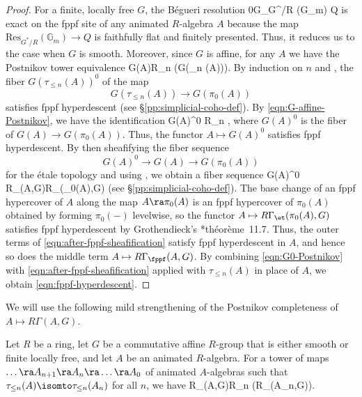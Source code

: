 \begin{proof}
For a finite, locally free $G$, the B\'{e}gueri resolution
\be \label{Begueri}
0\to G\to {}_{G^\ast/R} (\mathbb G_m) \to Q
\ee
is exact on the fppf site of any animated $R$-algebra $A$ because the map $\mathrm{Res}_{G^\ast/R} (\mathbb G_m) \to Q$ is faithfully flat and finitely presented. Thus, it reduces us to the case when $G$ is smooth. Moreover, since $G$ is affine, for any $A$ we have the Postnikov tower equivalence
\be \label{eqn:G-affine-Postnikov}
\tst G(A)\isomto R\lim_n (G(\tau_{\leq n} (A))).
\ee
By induction on $n$ and , the fiber $G(\tau_{\leq n}(A))^0$ of the map
\[
G(\tau_{\leq n}(A))\to G(\pi_0(A))
\]
satisfies fppf hyperdescent (see \S\ref{pp:simplicial-coho-def}). %
 By \eqref{eqn:G-affine-Postnikov}, we have the identification
\be \label{eqn:G0-Postnikov}
\tst G(A)^0 \cong R\lim_n ,
\ee
where $G(A)^0$ is the fiber of $G(A)\to G(\pi_0(A))$. Thus, the functor $A \mapsto G(A)^0$ satisfies fppf hyperdescent. By then sheafifying the fiber sequence
\[
G(A)^0 \to G(A)\to G(\pi_0(A))
\]
for the \'etale topology and using , we obtain a fiber sequence
\be \label{eqn:after-fppf-sheafification}
G(A)^0 \to R\Gamma_\et(A,G)\to R\Gamma_\et(\pi_0(A),G)
\ee
(see \S\ref{pp:simplicial-coho-def}). The base change of an fppf hypercover of $A$ along the map $A \ra \pi_0(A)$ is an fppf hypercover of $\pi_0(A)$ obtained by forming $\pi_0(-)$ levelwise, so the functor $A\mapsto R\Gamma_\et(\pi_0(A), G)$ satisfies fppf hyperdescent by Grothendieck's \cite{Gro68c}*{th\'{e}or\`{e}me~11.7}. Thus, the outer terms of \eqref{eqn:after-fppf-sheafification} satisfy fppf hyperdescent in $A$, and hence so does the middle term $A \mapsto R\Gamma_\fppf(A, G)$. By combining \eqref{eqn:G0-Postnikov} with \eqref{eqn:after-fppf-sheafification} applied with $\tau_{\le n}(A)$ in place of $A$, we obtain \eqref{eqn:fppf-hyperdescent}.
\end{proof}



We will use the following mild strengthening of the Postnikov completeness of $A\mapsto R\Gamma(A, G)$.

\bcor \label{cor:fppf-hyperdescent}
Let $R$ be a ring, let $G$ be a commutative affine $R$-group that is either smooth or finite locally free, and let $A$ be an animated $R$-algebra. For a tower of maps $\dotsc \ra A_{n + 1} \ra A_n \ra \dotsc \ra A_0$ of animated $A$-algebras such that $\tau_{\le n}(A) \isomto \tau_{\le n}(A_n)$ for all $n$, we have
\be \label{eqn:similar-to-Postnikov-tower}
\tst R\Gamma_\fppf(A,G)\isomto R\lim_n (R\Gamma_\fppf(A_n,G)).
\ee
\ecor

